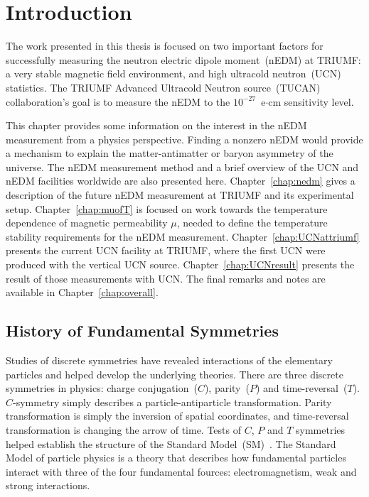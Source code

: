 \chapter{Introduction\label{chap:intro}}
\renewcommand{\thepage}{\arabic{page}}%
\setcounter{page}{1}%


The work presented in this thesis is focused on two important factors
for successfully measuring the neutron electric dipole moment~(nEDM)
at TRIUMF: a very stable magnetic field environment, and high
ultracold neutron~(UCN) statistics. The TRIUMF Advanced Ultracold
Neutron source~(TUCAN) collaboration's goal is to measure the nEDM to
the $10^{-27}$~e$\cdot$cm sensitivity level.


This chapter provides some information on the interest in the nEDM
measurement from a physics perspective. Finding a nonzero nEDM would
provide a mechanism to explain the matter-antimatter or baryon
asymmetry of the universe. The nEDM measurement method and a brief
overview of the UCN and nEDM facilities worldwide are also presented
here.  Chapter~\ref{chap:nedm} gives a description of the future nEDM
measurement at TRIUMF and its experimental
setup. Chapter~\ref{chap:muofT} is focused on work towards the
temperature dependence of magnetic permeability $\mu$, needed to
define the temperature stability requirements for the nEDM
measurement. Chapter~\ref{chap:UCNattriumf} presents the current UCN
facility at TRIUMF, where the first UCN were produced with the
vertical UCN source. Chapter~\ref{chap:UCNresult} presents the result
of those measurements with UCN. The final remarks and notes are
available in Chapter~\ref{chap:overall}.



\section{History of Fundamental Symmetries }

Studies of discrete symmetries have revealed interactions of the
elementary particles and helped develop the underlying theories.
There are three discrete symmetries in physics: charge
conjugation~($C$), parity~($P$) and time-reversal~($T$). $C$-symmetry
simply describes a particle-antiparticle transformation. Parity
transformation is simply the inversion of spatial coordinates, and
time-reversal transformation is changing the arrow of time.  Tests of
$C$, $P$ and $T$ symmetries helped establish the structure of the
Standard Model~(SM)~\cite{pospelov2005electric}. The Standard Model of
particle physics is a theory that describes how fundamental particles
interact with three of the four fundamental fources: electromagnetism,
weak and strong interactions.

